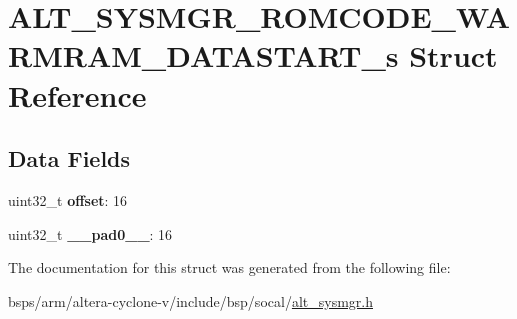 \hypertarget{structALT__SYSMGR__ROMCODE__WARMRAM__DATASTART__s}{}\section{A\+L\+T\+\_\+\+S\+Y\+S\+M\+G\+R\+\_\+\+R\+O\+M\+C\+O\+D\+E\+\_\+\+W\+A\+R\+M\+R\+A\+M\+\_\+\+D\+A\+T\+A\+S\+T\+A\+R\+T\+\_\+s Struct Reference}
\label{structALT__SYSMGR__ROMCODE__WARMRAM__DATASTART__s}
\subsection*{Data Fields}
\begin{DoxyCompactItemize}
\item 
\mbox{\label{structALT__SYSMGR__ROMCODE__WARMRAM__DATASTART__s_ae27cecdca8691fed47d6a7f82e43c7f5}} 
uint32\+\_\+t {\bfseries offset}\+: 16
\item 
\mbox{\label{structALT__SYSMGR__ROMCODE__WARMRAM__DATASTART__s_acc798f24dc0339cc4769630747e1344b}} 
uint32\+\_\+t {\bfseries \+\_\+\+\_\+pad0\+\_\+\+\_\+}\+: 16
\end{DoxyCompactItemize}


The documentation for this struct was generated from the following file\+:\begin{DoxyCompactItemize}
\item 
bsps/arm/altera-\/cyclone-\/v/include/bsp/socal/\mbox{\hyperlink{alt__sysmgr_8h}{alt\+\_\+sysmgr.\+h}}\end{DoxyCompactItemize}
